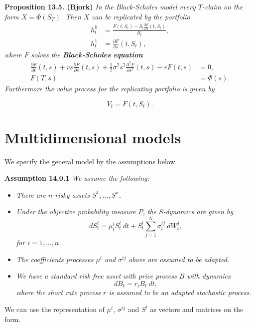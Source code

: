 \documentclass[a4paper,12pt,openany]{book}
\providecommand{\tightlist}{%
 \setlength{\itemsep}{0pt}\setlength{\parskip}{0pt}}
\begin{document}
\textbf{Proposition 13.5. (Bjork)} \emph{In the Black-Scholes model every \(T\)-claim on the form \(X=\Phi(S_T)\). Then \(X\) can be replicated by the portfolio}
\begin{align*}
h_t^0&=\frac{F(t,S_t)-S_t\frac{\partial F}{\partial s}(t,S_t)}{B_t},\tag{13.15}\\
h_t^1&=\frac{\partial F}{\partial s}(t,S_t),\tag{13.15}
\end{align*}
\emph{where \(F\) solves the \textbf{Black-Scholes equation}}
\begin{align*}
\frac{\partial F}{\partial t}(t,s)+rs\frac{\partial F}{\partial s}(t,s)+\frac{1}{2}\sigma^2s^2 \frac{\partial^2 F}{\partial s^2}(t,s)-rF(t,s)&=0,\tag{13.16}\\
F(T,s)&=\Phi(s).\tag{13.16}
\end{align*}
\emph{Furthermore the value process for the replicating portfolio is given by}

\[
V_t=F(t,S_t).
\]

\hypertarget{multidimensional-models}{%
\section{Multidimensional models}\label{multidimensional-models}}

We specify the general model by the assumptions below.

\textbf{Assumption 14.0.1} \emph{We assume the following:}

\begin{itemize}
\tightlist
\item
  \emph{There are \(n\) risky assets \(S^1,...,S^n\).}
\item
  \emph{Under the objective probability measure \(P\), the \(S\)-dynamics are given by}
  \[
    dS_t^i=\mu_t^iS_t^i\ dt +S_t^i\sum_{j=1}^N\sigma_t^{ij}\ dW_t^j,\tag{14.1}
    \]
  \emph{for \(i=1,...,n\).}
\item
  \emph{The coefficients processes \(\mu^i\) and \(\sigma^{ij}\) above are assumed to be adapted.}
\item
  \emph{We have a standard risk free asset with price process \(B\) with dynamics}
  \[
    dB_t=r_tB_t\ dt,\tag{14.2}
    \]
  \emph{where the short rate process \(r\) is assumed to be an adapted stochastic process.}
\end{itemize}

We can use the representation of \(\mu^i\), \(\sigma^{ij}\) and \(S^i\) as vectors and matrices on the form.
\end{document}

